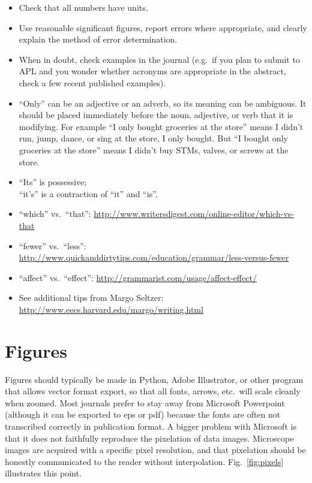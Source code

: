 \documentclass[aps,prb,twocolumn,superscriptaddress,floatfix,longbibliography]{revtex4-2}
\begin{document}
\begin{itemize}[label=$\Box$]
\item Check that all numbers have units.
\item Use reasonable significant figures, report errors where appropriate, and clearly explain the method of error determination.
\item When in doubt, check examples in the journal (e.g.\ if you plan to submit to APL and you wonder whether acronyms are appropriate in the abstract, check a few recent published examples).
\item ``Only'' can be an adjective or an adverb, so its meaning can be ambiguous. It should be placed immediately before the noun, adjective, or verb that it is modifying. For example ``I only bought groceries at the store'' means I didn't run, jump, dance, or sing at the store, I only bought. But ``I bought only groceries at the store'' means I didn't buy STMs, valves, or screws at the store.
\item ``Its'' is possessive;\\ ``it's'' is a contraction of ``it'' and ``is''.
\item ``which'' vs.\ ``that'': \url{http://www.writersdigest.com/online-editor/which-vs-that}
\item ``fewer'' vs.\ ``less'': \url{http://www.quickanddirtytips.com/education/grammar/less-versus-fewer}
\item ``affect'' vs.\ ``effect'': \url{http://grammarist.com/usage/affect-effect/}
\item See additional tips from Margo Seltzer: \url{http://www.eecs.harvard.edu/margo/writing.html}
\end{itemize}

\section{\label{sec:Figures}Figures}
Figures should typically be made in Python, Adobe Illustrator, or other program that allows vector format export, so that all fonts, arrows, etc.\ will scale cleanly when zoomed. Most journals prefer to stay away from Microsoft Powerpoint (although it can be exported to eps or pdf) because the fonts are often not transcribed correctly in publication format. A bigger problem with Microsoft is that it does not faithfully reproduce the pixelation of data images. Microscope images are acquired with a specific pixel resolution, and that pixelation should be honestly communicated to the reader without interpolation. Fig.\ \ref{fig:pixels} illustrates this point.
\end{document}
